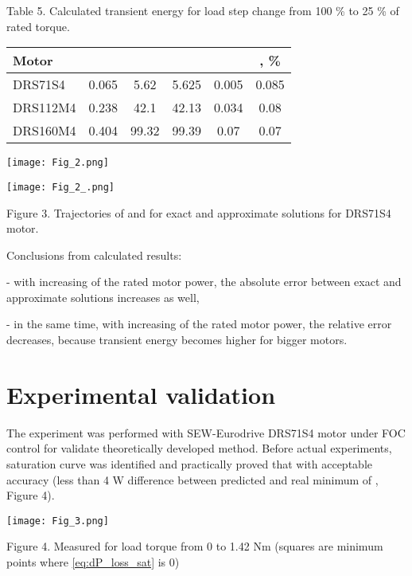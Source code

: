 \documentclass[journal]{IEEEtran}
\begin{document}
\begin{center}
Table 5.
Calculated transient energy for load step change from 100 \% to 25 \% of rated torque.

\begin{tabular}{ | l | c | c | c | c | c | }
\hline 
  Motor &  &  &  &  & , \% \\
\hline 
DRS71S4 & 0.065  & 5.62   & 5.625   & 0.005   & 0.085 \\
DRS112M4 & 0.238  & 42.1  & 42.13  &  0.034  &  0.08 \\
DRS160M4 & 0.404  & 99.32  & 99.39  &  0.07  &  0.07 \\
\hline 
\end{tabular}

\end{center}

\begin{center}
\ifpdf \texttt{[image: Fig\_2.png]}
\fi

\ifpdf \texttt{[image: Fig\_2\_.png]}
\fi

Figure 3. Trajectories of  and  for exact and approximate solutions for DRS71S4 motor.
\end{center}

Conclusions from calculated results:

- with increasing of the rated motor power, the absolute error  between exact and approximate solutions increases as well,

- in the same time, with increasing of the rated motor power, the relative error  decreases, because transient energy  becomes higher for bigger motors.


\section{Experimental validation}

The experiment was performed with SEW-Eurodrive DRS71S4 motor under FOC control for validate theoretically developed method. Before actual experiments, saturation curve  was identified and practically proved that  with acceptable accuracy (less than 4 W difference between predicted and real minimum of , Figure 4).

\begin{center}
\ifpdf \texttt{[image: Fig\_3.png]}
\fi

Figure 4. Measured  for load torque from 0 to 1.42 Nm (squares are minimum points where \eqref{eq:dP_loss_sat} is 0)
\end{center}
\end{document}
